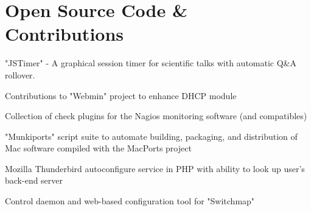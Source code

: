 \documentclass[letterpaper]{deedy-resume}
\begin{document}
\sectionspace
\section{Open Source Code \& Contributions}
\vspace{8pt}
\begin{tightitemize}
	\item "JSTimer" - A graphical session timer for scientific talks with automatic Q\&A rollover.
	\item Contributions to "Webmin" project to enhance DHCP module
	\item Collection of check plugins for the Nagios monitoring software (and compatibles)
	\item "Munkiports" script suite to automate building, packaging, and distribution of Mac software compiled with the MacPorts project
	\item Mozilla Thunderbird autoconfigure service in PHP with ability to look up user's back-end server
	\item Control daemon and web-based configuration tool for "Switchmap"
\end{tightitemize}
\end{document}
